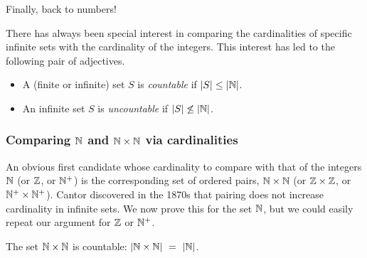 \medskip

Finally, back to numbers!

There has always been special interest in comparing the cardinalities of
specific infinite sets with the cardinality of the integers.  This
interest has led to the following pair of adjectives.
\begin{itemize}
\item
A (finite or infinite) set $S$ is {\it countable}   if $|S| \leq |\mathbb{N}|$.
\item
An infinite set $S$ is {\it uncountable} 
 if $|S| \not\leq |\mathbb{N}|$.
\end{itemize}

\subsubsection{Comparing $\mathbb{N}$ and $\mathbb{N} \times \mathbb{N}$ via cardinalities}
\label{sec:compare-NxN-N-via-card}

An obvious first candidate whose cardinality to compare with that of
the integers $\mathbb{N}$ (or $\mathbb{Z}$, or $\mathbb{N}^+$) is the corresponding set of
ordered pairs, $\mathbb{N} \times \mathbb{N}$ (or $\mathbb{Z} \times \mathbb{Z}$, or $\mathbb{N}^+ \times
\mathbb{N}^+$).  Cantor discovered in the 1870s that pairing does not increase
cardinality in infinite sets.  We now prove this for the set $\mathbb{N}$, but
we could easily repeat our argument for $\mathbb{Z}$ or $\mathbb{N}^+$.

\begin{prop}
\label{thm:|NxN|=|N|}
The set $\mathbb{N} \times \mathbb{N}$ is countable:
$|\mathbb{N} \times \mathbb{N}| \ = \ |\mathbb{N}|$.
\end{prop}



